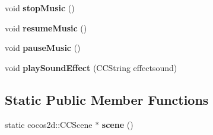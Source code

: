 \begin{DoxyCompactItemize}
\item 
\hypertarget{class_j_g___game___main_ad7c2cf4f1fe68a18baf4f217520183b9}{void {\bfseries stop\-Music} ()}\label{class_j_g___game___main_ad7c2cf4f1fe68a18baf4f217520183b9}

\item 
\hypertarget{class_j_g___game___main_ad982334d650a1f53e0ba707ca3af715e}{void {\bfseries resume\-Music} ()}\label{class_j_g___game___main_ad982334d650a1f53e0ba707ca3af715e}

\item 
\hypertarget{class_j_g___game___main_aa27677a3be2463834027d18139021861}{void {\bfseries pause\-Music} ()}\label{class_j_g___game___main_aa27677a3be2463834027d18139021861}

\item 
\hypertarget{class_j_g___game___main_a5656a74c9c4b09329288a929b91fe3fe}{void {\bfseries play\-Sound\-Effect} (C\-C\-String effectsound)}\label{class_j_g___game___main_a5656a74c9c4b09329288a929b91fe3fe}

\end{DoxyCompactItemize}
\subsection*{Static Public Member Functions}
\begin{DoxyCompactItemize}
\item 
\hypertarget{class_j_g___game___main_ad8df9f7dc524c5e4096ba72ca3d225a0}{static cocos2d\-::\-C\-C\-Scene $\ast$ {\bfseries scene} ()}\label{class_j_g___game___main_ad8df9f7dc524c5e4096ba72ca3d225a0}

\end{DoxyCompactItemize}
